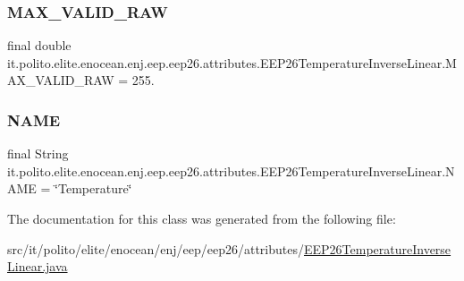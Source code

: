 \subsubsection{\texorpdfstring{M\+A\+X\+\_\+\+V\+A\+L\+I\+D\+\_\+\+R\+AW}{MAX\_VALID\_RAW}}
{\footnotesize\ttfamily final double it.\+polito.\+elite.\+enocean.\+enj.\+eep.\+eep26.\+attributes.\+E\+E\+P26\+Temperature\+Inverse\+Linear.\+M\+A\+X\+\_\+\+V\+A\+L\+I\+D\+\_\+\+R\+AW = 255.\hspace{0.3cm}{\ttfamily [static]}}

\hypertarget{classit_1_1polito_1_1elite_1_1enocean_1_1enj_1_1eep_1_1eep26_1_1attributes_1_1_e_e_p26_temperature_inverse_linear_a19125654990459fdd103aa929a73be77}{}\label{classit_1_1polito_1_1elite_1_1enocean_1_1enj_1_1eep_1_1eep26_1_1attributes_1_1_e_e_p26_temperature_inverse_linear_a19125654990459fdd103aa929a73be77} 
\subsubsection{\texorpdfstring{N\+A\+ME}{NAME}}
{\footnotesize\ttfamily final String it.\+polito.\+elite.\+enocean.\+enj.\+eep.\+eep26.\+attributes.\+E\+E\+P26\+Temperature\+Inverse\+Linear.\+N\+A\+ME = \char`\"{}Temperature\char`\"{}\hspace{0.3cm}{\ttfamily [static]}}



The documentation for this class was generated from the following file\+:\begin{DoxyCompactItemize}
\item 
src/it/polito/elite/enocean/enj/eep/eep26/attributes/\hyperlink{_e_e_p26_temperature_inverse_linear_8java}{E\+E\+P26\+Temperature\+Inverse\+Linear.\+java}\end{DoxyCompactItemize}
